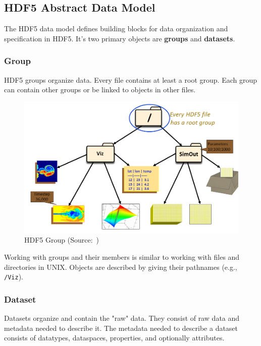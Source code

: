 \documentclass[thesis=M,english]{FITthesis}[2019/12/23]
\begin{document}
\subsection{HDF5 Abstract Data Model}

The HDF5 data model defines building blocks for data organization and specification in HDF5.
It's two primary objects are \textbf{groups} and \textbf{datasets}.

\subsubsection{Group}

HDF5 groups organize data. Every file contains at least a root group.
Each group can contain other groups or be linked to objects in other files.

\begin{figure}[!h]
    \centering
    \includegraphics[scale=0.3]{static/group.png}
    \caption{HDF5 Group (Source:~\cite{hdf5})}
\end{figure}

Working with groups and their members is similar to working with files and directories in UNIX.
Objects are described by giving their pathnames (e.g., \texttt{/Viz}).

\subsubsection{Dataset}

Datasets organize and contain the "raw" data. They consist of raw data and metadata needed to describe it.
The metadata needed to describe a dataset consists of datatypes, dataspaces, properties, and optionally
attributes.
\end{document}

